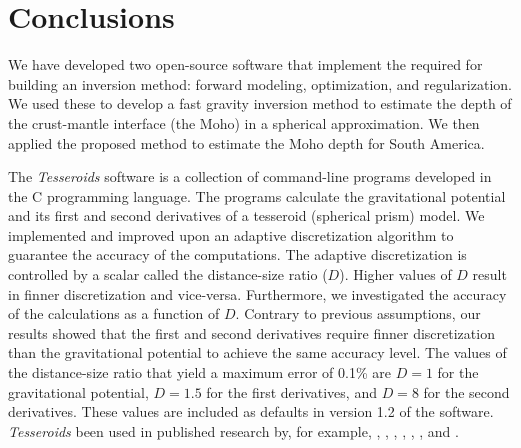 \chapter{Conclusions}


We have developed two open-source software \DIFdelbegin {}\DIFdelend \DIFaddbegin {}\DIFaddend that implement the
\DIFdelbegin {}\DIFdelend \DIFaddbegin {}\DIFaddend required for building an inversion method: forward modeling,
optimization, and regularization.
We used these \DIFdelbegin {}\DIFdelend \DIFaddbegin {}\DIFaddend to develop a fast gravity inversion method to estimate
the depth of the crust-mantle interface (the Moho) in a spherical
approximation.
We then applied the proposed method to estimate the Moho depth for South
America.
\DIFdelbegin {}\DIFdelend 

The \textit{Tesseroids} software is a collection of command-line
programs developed in the C programming language.
The programs calculate the gravitational potential and its first and second
derivatives of a tesseroid (spherical prism) model.
We implemented and improved upon an adaptive discretization algorithm to
guarantee the accuracy of the computations.
The adaptive discretization is controlled by a scalar called the distance-size
ratio ($D$).
Higher values of $D$ result in finner discretization and vice-versa.
Furthermore, we investigated the accuracy of the calculations as a function of
$D$.
Contrary to previous assumptions, our results showed that the first and second
derivatives require finner discretization than the gravitational potential to
achieve the same accuracy level.
The values of the distance-size ratio that yield a maximum error of 0.1\%
are $D = 1$ for the gravitational potential, $D = 1.5$ for the first
derivatives, and $D = 8$ for the second derivatives.
These values are included as defaults \DIFaddbegin {}\DIFaddend in version 1.2 of the software.
\DIFaddbegin {}\DIFaddend \textit{Tesseroids} \DIFdelbegin {}\DIFdelend \DIFaddbegin {}\DIFaddend been used in published research
by, for example,
\citet{braitenberg2011}, \citet{alvarez2012}, \citet{bouman2013},
\citet{bouman2013a}, \citet{mariani2013}, \citet{braitenberg2015}, and
\citet{fullea2015a}.

